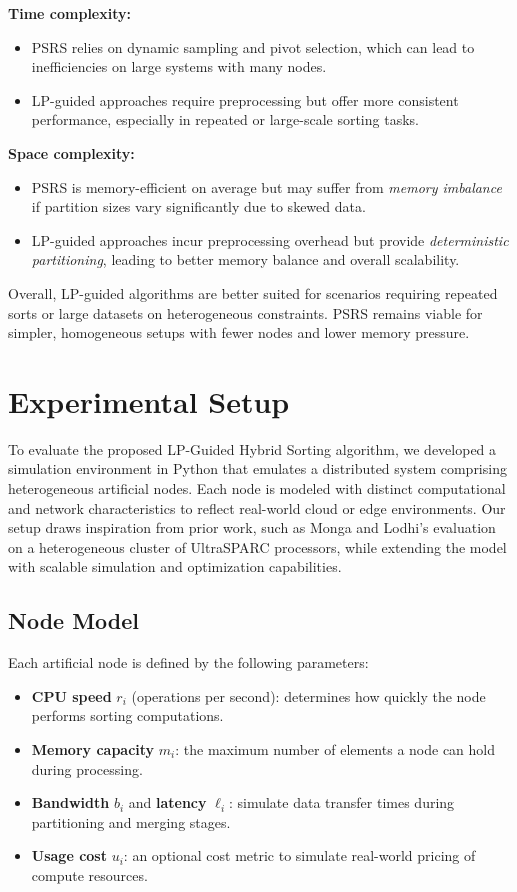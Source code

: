 \documentclass[]{interact}
\theoremstyle{plain}
\theoremstyle{definition}
\theoremstyle{remark}
\begin{document}
\textbf{Time complexity:}
\begin{itemize}
    \item PSRS relies on dynamic sampling and pivot selection, which can lead to inefficiencies on large systems with many nodes.
    \item LP-guided approaches require preprocessing but offer more consistent performance, especially in repeated or large-scale sorting tasks.
\end{itemize}

\textbf{Space complexity:}
\begin{itemize}
    \item PSRS is memory-efficient on average but may suffer from \textit{memory imbalance} if partition sizes vary significantly due to skewed data.
    \item LP-guided approaches incur preprocessing overhead but provide \textit{deterministic partitioning}, leading to better memory balance and overall scalability.
\end{itemize}

Overall, LP-guided algorithms are better suited for scenarios requiring repeated sorts or large datasets on heterogeneous constraints. PSRS remains viable for simpler, homogeneous setups with fewer nodes and lower memory pressure.


\section{Experimental Setup}

To evaluate the proposed LP-Guided Hybrid Sorting algorithm, we developed a simulation environment in Python that emulates a distributed system comprising heterogeneous artificial nodes. Each node is modeled with distinct computational and network characteristics to reflect real-world cloud or edge environments. Our setup draws inspiration from prior work, such as Monga and Lodhi’s evaluation on a heterogeneous cluster of UltraSPARC processors, while extending the model with scalable simulation and optimization capabilities.

\subsection{Node Model}
Each artificial node is defined by the following parameters:
\begin{itemize}
\item \textbf{CPU speed} $r_i$ (operations per second): determines how quickly the node performs sorting computations.
\item \textbf{Memory capacity} $m_i$: the maximum number of elements a node can hold during processing.
\item \textbf{Bandwidth} $b_i$ and \textbf{latency} $\ell_i$: simulate data transfer times during partitioning and merging stages.
\item \textbf{Usage cost} $u_i$: an optional cost metric to simulate real-world pricing of compute resources.
\end{itemize}
\end{document}
